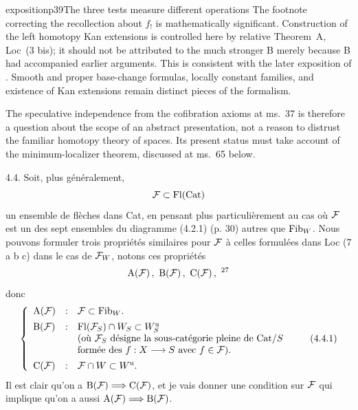 \begin{dcomment}{exposition}{p39}{The three tests measure different operations}
The footnote correcting the recollection about $f_!$ is mathematically significant. Construction of the left homotopy Kan extensions is controlled here by relative Theorem~A, Loc~(3 bis); it should not be attributed to the much stronger B merely because B had accompanied earlier arguments. This is consistent with the later exposition of \citet[pp.~3--4]{Maltsiniotis2005Asphericite}. Smooth and proper base-change formulas, locally constant families, and existence of Kan extensions remain distinct pieces of the formalism.

The speculative independence from the cofibration axioms at ms.~37 is therefore a question about the scope of an abstract presentation, not a reason to distrust the familiar homotopy theory of spaces. Its present status must take account of the minimum-localizer theorem, discussed at ms.~65 below.
\end{dcomment}


4.4. Soit, plus généralement,
\[
\mathcal{F} \subset \operatorname{Fl}(\mathrm{Cat})
\]
un ensemble de flèches dans Cat, en pensant plus particulièrement au cas où $\mathcal{F}$ est un des sept ensembles du diagramme (4.2.1) (p. 30) autres que $\mathrm{Fib}_W$. Nous pouvons formuler trois propriétés similaires pour $\mathcal{F}$ à celles formulées dans Loc (7 a b c) dans le cas de $\mathcal{F}_W$, notons ces propriétés
\[
\mathrm{A}(\cF)\,,\ \mathrm{B}(\cF)\,,\ \mathrm{C}(\cF)\,,\ \text{\footnotemark[27]}
\]
donc
\[
\left\{
\begin{array}{lcl}
\mathrm{A}(\mathcal{F}) & : & \mathcal{F} \subset \mathrm{Fib}_W. \\[1ex]
\mathrm{B}(\mathcal{F}) & : & \operatorname{Fl}(\mathcal{F}_S) \cap W_S \subset W_S^{\mathrm{u}} \\
 & & \text{(où $\mathcal{F}_S$ désigne la sous-catégorie pleine de $\mathrm{Cat}/S$} \\
 & & \text{formée des $f : X \longrightarrow S$ avec $f \in \mathcal{F}$).} \\[1ex]
\mathrm{C}(\mathcal{F}) & : & \mathcal{F} \cap W \subset W^{\mathrm{u}}.
\end{array}
\right.
\tag*{(4.4.1)}
\]
Il est clair qu'on a $\mathrm{B}(\mathcal{F}) \Longrightarrow \mathrm{C}(\mathcal{F})$, et je vais donner une condition sur $\mathcal{F}$ qui implique qu'on a aussi $\mathrm{A}(\mathcal{F}) \Longrightarrow \mathrm{B}(\mathcal{F})$.


